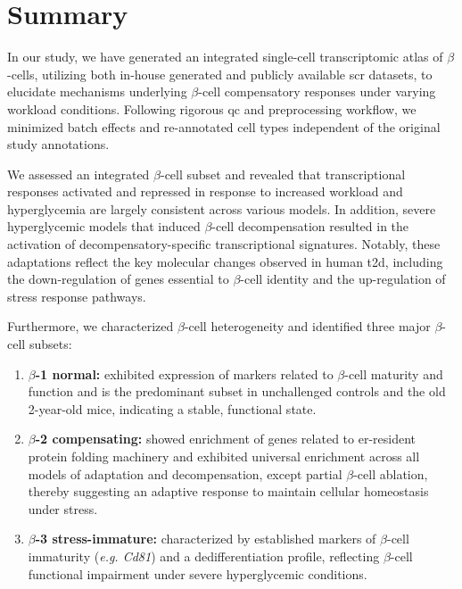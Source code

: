 \clearpage

\section[Summary]{Summary}
\label{sec:chp3_summary}

\par In our study, we have generated an integrated single-cell transcriptomic atlas of $\beta$-cells, utilizing both in-house generated and publicly available \gls{scr} datasets, to elucidate mechanisms underlying $\beta$-cell compensatory responses under varying workload conditions. Following rigorous \gls{qc} and preprocessing workflow, we minimized batch effects and re-annotated cell types independent of the original study annotations.\\

\par We assessed an integrated $\beta$-cell subset and revealed that transcriptional responses activated and repressed in response to increased workload and hyperglycemia are largely consistent across various models. In addition, severe hyperglycemic models that induced $\beta$-cell decompensation resulted in the activation of decompensatory-specific transcriptional signatures. Notably, these adaptations reflect the key molecular changes observed in human \gls{t2d}, including the down-regulation of genes essential to $\beta$-cell identity and the up-regulation of stress response pathways.\\

\par Furthermore, we characterized $\beta$-cell heterogeneity and identified three major $\beta$-cell subsets:

\begin{enumerate}
    \item \textbf{$\beta$-1 normal:} exhibited expression of markers related to $\beta$-cell maturity and function and is the predominant subset in unchallenged controls and the old 2-year-old mice, indicating a stable, functional state.
    \item \textbf{$\beta$-2 compensating:} showed enrichment of genes related to \gls{er}-resident protein folding machinery and exhibited universal enrichment across all models of adaptation and decompensation, except partial $\beta$-cell ablation, thereby suggesting an adaptive response to maintain cellular homeostasis under stress.
    \item \textbf{$\beta$-3 stress-immature:} characterized by established markers of $\beta$-cell immaturity (\textit{e.g. Cd81}) and a dedifferentiation profile, reflecting $\beta$-cell functional impairment under severe hyperglycemic conditions.
\end{enumerate}

